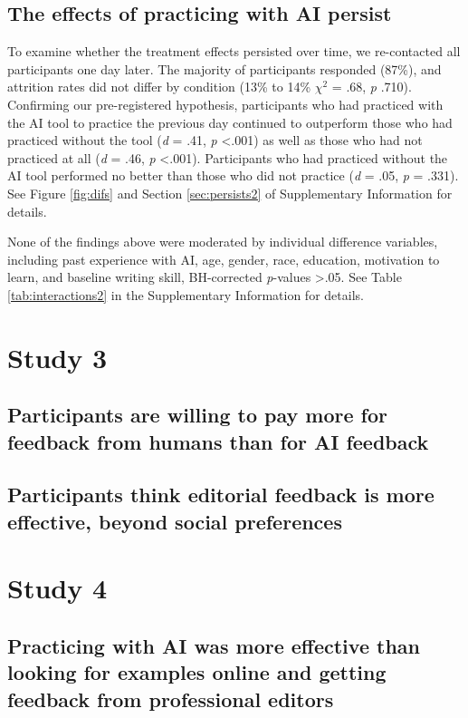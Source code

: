 \documentclass[11pt]{report}
\begin{document}
\begin{mainf}
\subsection{The effects of practicing with AI persist}
To examine whether the treatment effects persisted over time, we re-contacted all
participants one day later. The majority of participants responded
(87\%), and attrition rates did not differ by condition (13\% to
14\% \(\chi^2\) = .68, \textit{p} .710). Confirming our pre-registered
hypothesis, participants who had practiced with the AI tool to practice the
previous day continued to outperform those who had practiced without the
tool (\emph{d} = .41, \emph{p} \textless.001) as well as those who had
not practiced at all (\emph{d} = .46, \emph{p} \textless.001).
Participants who had practiced without the AI tool performed no better
than those who did not practice (\emph{d} = .05, \emph{p} = .331). See Figure \ref{fig:difs} and Section \ref{sec:persists2} of Supplementary Information for details.

None of the findings above were moderated by individual difference
variables, including past experience with AI, age, gender, race,
education, motivation to learn, and baseline writing skill, BH-corrected
\textit{p}-values \textgreater .05. See Table \ref{tab:interactions2} in
the Supplementary Information for details.

\section{Study 3}

\subsection{Participants are willing to pay more for feedback from humans than for AI feedback}

\subsection{Participants think editorial feedback is more effective, beyond social preferences}

\section{Study 4}
\subsection{Practicing with AI was more effective than looking for examples online and getting feedback from professional editors}


\end{mainf}
\end{document}
